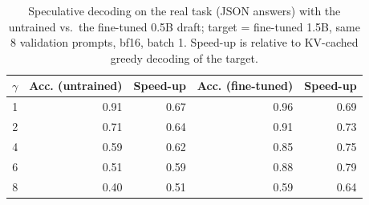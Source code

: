 \begin{table}[t]
\centering
\footnotesize
\caption{Speculative decoding on the real task (JSON answers) with the untrained vs.\ the fine-tuned 0.5B draft; target = fine-tuned 1.5B, same 8 validation prompts, bf16, batch 1. Speed-up is relative to KV-cached greedy decoding of the target.}
\label{tab:draft}
\begin{tabular}{rrrrr}
\toprule
$\gamma$ & Acc. (untrained) & Speed-up & Acc. (fine-tuned) & Speed-up \\
\midrule
1 & 0.91 & 0.67 & 0.96 & 0.69 \\
2 & 0.71 & 0.64 & 0.91 & 0.73 \\
4 & 0.59 & 0.62 & 0.85 & 0.75 \\
6 & 0.51 & 0.59 & 0.88 & 0.79 \\
8 & 0.40 & 0.51 & 0.59 & 0.64 \\
\bottomrule
\end{tabular}
\end{table}
